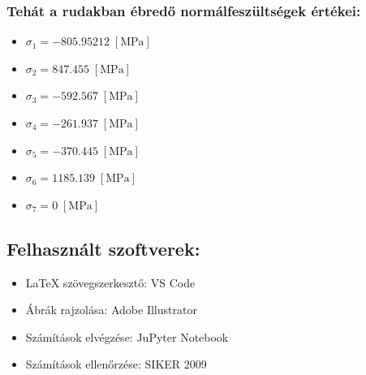 \documentclass[12pt,a4paper]{article}
\def\Mpa{\; \left[\mathrm{MPa}\right]}
\begin{document}
\subsubsection*{Tehát a rudakban ébredő normálfeszültségek értékei:}
\begin{multicols}{2}
    \begin{itemize}
        \item $\sigma_1= -805.95212 \Mpa$
        \item $\sigma_2=  847.455 \Mpa$
        \item $\sigma_3=  -592.567 \Mpa$
        \item $\sigma_4=  -261.937 \Mpa$
    \end{itemize}
    \columnbreak
    \begin{itemize}
        \item $\sigma_5= -370.445 \Mpa$
        \item $\sigma_6=  1185.139 \Mpa$
        \item $\sigma_7=  0 \Mpa$
    \end{itemize}
\end{multicols}
\newpage
\tableofcontents

\subsection*{Felhasznált szoftverek:}
\begin{itemize}
    \item \LaTeX \hspace{0.4mm} szövegszerkesztő: VS Code
    \item Ábrák rajzolása: Adobe Illustrator
    \item Számítások elvégzése: JuPyter Notebook
    \item Számítások ellenőrzése: SIKER 2009
\end{itemize}
\end{document}
